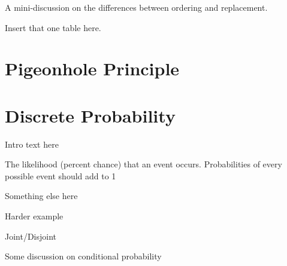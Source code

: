 \documentclass[main.tex]{subfiles}
\begin{document}
A mini-discussion on the differences between ordering and replacement.

Insert that one table here.

\section{Pigeonhole Principle}

\begin{thm}
	
\end{thm}

\begin{thm}
	
\end{thm}

\section{Discrete Probability}

Intro text here

\begin{defn}
	The likelihood (percent chance) that an event occurs. Probabilities of every possible event should add to 1
\end{defn}

\begin{example}
	
\end{example}

Something else here

\begin{example}
	Harder example
\end{example}

Joint/Disjoint

\begin{defn}
	
\end{defn}

\begin{defn}
	
\end{defn}

Some discussion on conditional probability

\begin{defn}
	
\end{defn}
\end{document}
